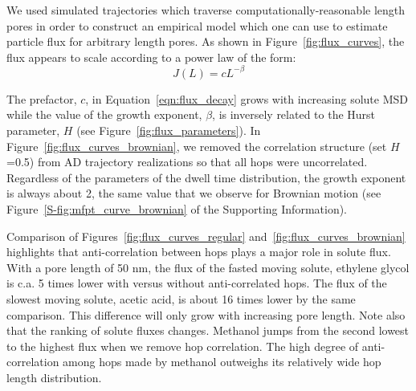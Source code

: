 \documentclass{article}
\begin{document}
  We used simulated trajectories which traverse computationally-reasonable length
  pores in order to construct an empirical model which one can use to estimate 
  particle flux for arbitrary length pores. As shown in Figure~\ref{fig:flux_curves},
  the flux appears to scale according to a power law of the form:
  \begin{equation}
  J(L) = cL^{-\beta} 
  \label{eqn:flux_decay}
  \end{equation}

  The prefactor, $c$, in Equation~\ref{eqn:flux_decay} grows with increasing
  solute MSD while the value of the growth exponent, $\beta$, is inversely 
  related to the Hurst parameter, $H$ (see Figure~\ref{fig:flux_parameters}).
  In Figure~\ref{fig:flux_curves_brownian}, we removed the correlation 
  structure (set $H$=0.5) from AD trajectory realizations so that all hops 
  were uncorrelated. Regardless of the parameters of the dwell time distribution,
  the growth exponent is always about 2, the same value that we observe for 
  Brownian motion (see Figure~\ref{S-fig:mfpt_curve_brownian} of the 
  Supporting Information). 

  
  Comparison of Figures~\ref{fig:flux_curves_regular} and~\ref{fig:flux_curves_brownian}
  highlights that anti-correlation between hops plays a major role in solute flux.
  With a pore length of 50 nm, the flux of the fasted moving solute, ethylene glycol is 
  c.a. 5 times lower with versus without anti-correlated hops. The flux of the slowest
  moving solute, acetic acid, is about 16 times lower by the same comparison. This 
  difference will only grow with increasing pore length. Note also that the ranking
  of solute fluxes changes. Methanol jumps from the second lowest to the highest
  flux when we remove hop correlation. The high degree of anti-correlation among
  hops made by methanol outweighs its relatively wide hop length distribution.
  
\end{document}
